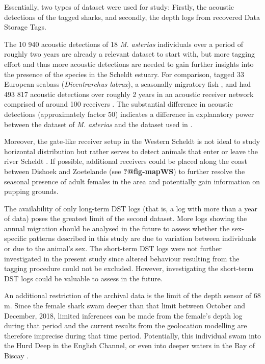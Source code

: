 \documentclass[
  authoryear,
  review,
  3p]{elsarticle}
\begin{document}
Essentially, two types of dataset were used for study: Firstly, the
acoustic detections of the tagged sharks, and secondly, the depth logs
from recovered Data Storage Tags.

The 10 940 acoustic detections of 18 \emph{M. asterias} individuals over
a period of roughly two years are already a relevant dataset to start
with, but more tagging effort and thus more acoustic detections are
needed to gain further insights into the presence of the species in the
Scheldt estuary. For comparison, \citet{hereu_2023} tagged 33 European
seabass (\emph{Dicentrarchus labrax}), a seasonally migratory fish
\citep{pawson_2007}, and had 493 817 acoustic detections over roughly 2
years in an acoustic receiver network comprised of around 100 receivers
\citep{aspillaga_2017}. The substantial difference in acoustic
detections (approximately factor 50) indicates a difference in
explanatory power between the dataset of \emph{M. asterias} and the
dataset used in \citet{hereu_2023}.

Moreover, the gate-like receiver setup in the Western Scheldt is not
ideal to study horizontal distribution but rather serves to detect
animals that enter or leave the river Scheldt \citep{reubens_2019}. If
possible, additional receivers could be placed along the coast between
Dishoek and Zoetelande (see \textbf{?@fig-mapWS}) to further resolve the
seasonal presence of adult females in the area and potentially gain
information on pupping grounds.

The availability of only long-term DST logs (that is, a log with more
than a year of data) poses the greatest limit of the second dataset.
More logs showing the annual migration should be analysed in the future
to assess whether the sex-specific patterns described in this study are
due to variation between individuals or due to the animal's sex. The
short-term DST logs were not further investigated in the present study
since altered behaviour resulting from the tagging procedure could not
be excluded. However, investigating the short-term DST logs could be
valuable to assess in the future.

An additional restriction of the archival data is the limit of the depth
sensor of 68 m. Since the female shark swam deeper than that limit
between October and December, 2018, limited inferences can be made from
the female's depth log during that period and the current results from
the geolocation modelling are therefore imprecise during that time
period. Potentially, this individual swam into the Hurd Deep in the
English Channel, or even into deeper waters in the Bay of Biscay
\citep[as hypothesised by][]{breve_2016}.
\end{document}
